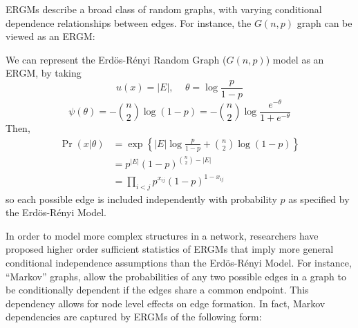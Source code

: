  
ERGMs  describe a broad class of random graphs, with varying conditional dependence relationships between edges.  For instance, the $G(n,p)$ graph can be viewed as an ERGM:
 
 \begin{example}[$G(n,p)$ graphs]
 	\label{ex:ER_model}
 We can represent the Erd\"{o}s-R\'{e}nyi Random Graph ($G(n,p)$) model as an ERGM, by taking 
 $$u(x) = |E| \text{, } \quad
 \theta = \log \frac{p}{1-p}$$ %
  $$\psi(\theta)  = -\binom{n}{2} \log(1-p) = -\binom{n}{2} \log \frac{e^{-\theta}}{1+ e^{-\theta}}
  $$
  Then, 
  \begin{align*}
    \Pr(x|\theta) & = \exp\left\{ |E| \log \frac{p}{1-p} + \binom{n}{2} \log(1-p)  \right\}  \\
    & = p^{|E|} (1-p)^{\binom{n}{2} - |E|}\\
    & = \prod_{i < j} p^{x_{ij}} (1-p)^{1 - x_{ij}}
  \end{align*}
  so each possible edge is included independently with probability $p$ as specified by the Erd\"{o}s-R\'{e}nyi Model.
 \end{example}

In order to model more complex structures in a network,  researchers have proposed higher order sufficient statistics of ERGMs that imply more general conditional independence assumptions than the Erd\"{o}s-R\'{e}nyi Model. For instance,  ``Markov'' graphs, allow the probabilities of any two possible edges in a graph to be conditionally dependent if the edges share a common endpoint. This dependency allows for node level effects on edge formation. In fact, Markov dependencies are captured by ERGMs of the following form:

